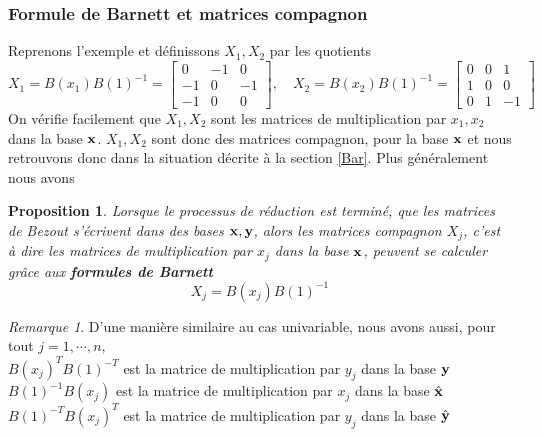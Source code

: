 \documentclass{article}
\theoremstyle{plain}%
\newtheorem{prop}{Proposition}
\theoremstyle{definition}
\theoremstyle{remark}
\newtheorem*{rem}{Remarque}
\begin{document}
\subsubsection{Formule de Barnett et matrices compagnon}
Reprenons l'exemple \label{ex_bez_multi} et définissons $X_1, X_2$ par les quotients
\begin{equation}
	X_1 = B(x_1)B(1)^{-1} =
	\begin{bmatrix}
		0 & -1 & 0\\
		-1 & 0 & -1\\
		-1 & 0 & 0
	\end{bmatrix},\quad
	X_2 = B(x_2)B(1)^{-1} =
	\begin{bmatrix}
		0 & 0 & 1\\
		1 & 0 & 0\\
		0 & 1 & -1
	\end{bmatrix}
\end{equation}
On vérifie facilement que $X_1, X_2$ sont les matrices de multiplication par $x_1, x_2$ dans la base $\bold{x}$. $X_1, X_2$ sont donc des matrices compagnon, pour la base $\bold{x}$ et nous retrouvons donc dans la situation décrite à la section \ref{Bar}. Plus généralement nous avons
\begin{prop}
\label{Barnett_multi}
Lorsque le processus de réduction est terminé, que les matrices de Bezout s'écrivent dans des bases $\bold{x, y}$, alors les matrices compagnon $X_j$, c'est à dire les matrices de multiplication par $x_j$ dans la base $\bold{x}$, peuvent se calculer grâce aux {\bf formules de Barnett}
\begin{equation}
	X_j = B(x_j)B(1)^{-1}
\end{equation}
\end{prop}

\begin{rem}
D'une manière similaire au cas univariable, nous avons aussi, pour tout $j=1,\cdots,n$,\\
$B(x_j)^{T}B(1)^{-T}$ est la matrice de multiplication par $y_j$ dans la base $\bold{y}$ \\
$B(1)^{-1}B(x_j)$ est la matrice de multiplication par $x_j$ dans la base $\hat{\bold{x}}$ \\
$B(1)^{-T}B(x_j)^{T}$ est la matrice de multiplication par $y_j$ dans la base $\hat{\bold{y}}$
\end{rem}
\end{document}
